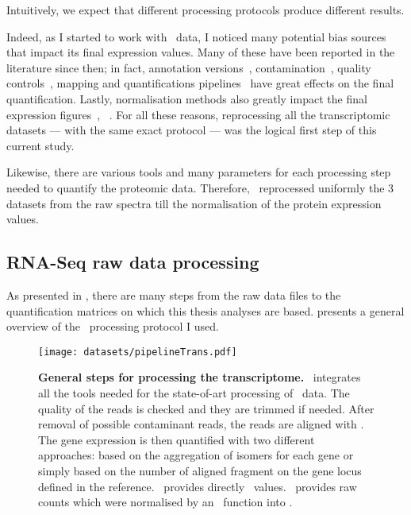 Intuitively, we expect that different processing protocols produce
different results.

Indeed, as I started to work with \Rnaseq\ data, I noticed many potential bias
sources that impact its final expression values. Many of these have been
reported in the literature since then; in fact,
annotation versions~,
contamination~,
quality controls~,
mapping and quantifications pipelines~
have great effects on the final quantification. Lastly, normalisation
methods also greatly impact the final expression figures~,%
~. For all these reasons,
reprocessing all the transcriptomic datasets --- with the same exact protocol ---
was the logical first step of this current study.

Likewise, there are various tools and many parameters for each processing step
needed to quantify the proteomic data. Therefore, \james\ reprocessed
uniformly the 3 datasets from the raw spectra till the normalisation of the
protein expression values.

\subsection{RNA-Seq raw data processing}

As presented in , there are many steps from the raw data
files to the quantification matrices on which this thesis analyses are based.
 presents a general overview of the \Rnaseq\ processing
protocol I used.

\begin{figure}
    \texttt{[image: datasets/pipelineTrans.pdf]}\centering
    \caption[General steps for processing the transcriptomic
    data]{\label{fig:pipelineTrans}\textbf{General steps for processing the
    transcriptome.} \irap\ integrates all the tools needed for the state-of-art
    processing of \Rnaseq\ data. The quality of the reads is checked and they
    are trimmed if needed. After removal of possible contaminant reads, the reads
    are aligned with \toph. The gene expression is then quantified with two
    different approaches: based on the aggregation of isomers for each gene or
    simply based on the number of aligned fragment on the gene locus defined in
    the reference. \cuffl\ provides directly \FPKM\ values. \htseq\ provides
    raw counts which were normalised by an \irap\ function into \FPKM.}
\end{figure}

